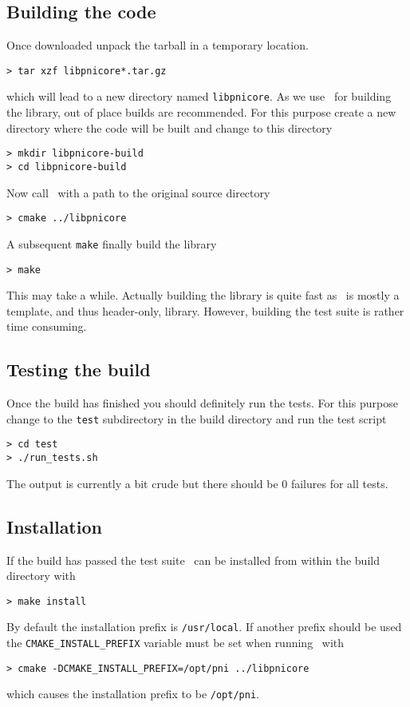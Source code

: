 \subsection{Building the code}

Once downloaded unpack the tarball in a temporary location. 
\begin{verbatim}
> tar xzf libpnicore*.tar.gz
\end{verbatim}
which will lead to a new directory named \texttt{libpnicore}. As we use \cmake\ for
building the library, out of place builds are recommended. For this purpose 
create a new directory where the code will be built and change to this directory
\begin{verbatim}
> mkdir libpnicore-build
> cd libpnicore-build
\end{verbatim}
Now call \cmake\ with a path to the original source directory
\begin{verbatim}
> cmake ../libpnicore
\end{verbatim}
A subsequent \texttt{make} finally build the library
\begin{verbatim}
> make
\end{verbatim}
This may take a while. Actually building the library is quite fast as
\libpnicore\ is mostly a template, and thus header-only, library. 
However, building the test suite is rather time consuming. 

\subsection{Testing the build}

Once the build has finished you should definitely run the tests. For this
purpose change to the \texttt{test} subdirectory in the build directory and run 
the test script
\begin{verbatim}
> cd test
> ./run_tests.sh
\end{verbatim}
The output is currently a bit crude but there should be $0$ failures for all
tests.

\subsection{Installation}

If the build has passed the test suite \libpnicore\ can be installed from within
the build directory with
\begin{verbatim}
> make install
\end{verbatim}
By default the installation prefix is \texttt{/usr/local}. If another prefix should
be used the \texttt{CMAKE\_INSTALL\_PREFIX} variable must be set when running
\cmake\ with
\begin{verbatim}
> cmake -DCMAKE_INSTALL_PREFIX=/opt/pni ../libpnicore
\end{verbatim}
which causes the installation prefix to be \texttt{/opt/pni}. 
